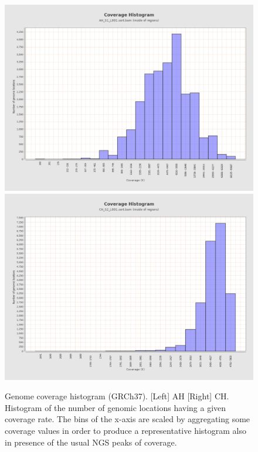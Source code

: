 \documentclass{article}
\begin{document}
\begin{figure}[ht] \hspace*{0cm} 
\begin{center}
    \includegraphics[scale=0.15]{qualimap/AH_S1_L001.sort_stats/images_qualimapReport/genome_coverage_histogram}
        \includegraphics[scale=0.15]{qualimap/CH_S2_L001.sort_stats/images_qualimapReport/genome_coverage_histogram}
	\caption{
	Genome coverage histogram (GRCh37). [Left] AH [Right] CH.
	Histogram of the number of genomic locations having a given coverage rate. The bins of the x-axis are scaled by aggregating some coverage values in order to produce a representative histogram also in presence of the usual NGS peaks of coverage.
	}
	\label{fig:qualimap_gen_cov_hist}
\end{center}
\end{figure}
\end{document}
